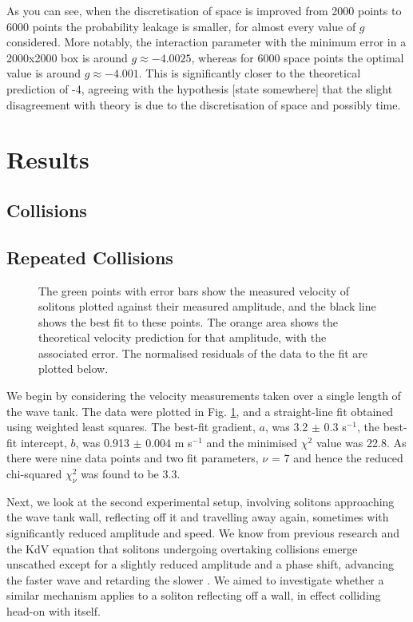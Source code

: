 \documentclass[10pt, twocolumn]{revtex4}    %
\begin{document}
As you can see, when the discretisation of space is improved from 2000 points to 6000 points the probability leakage is smaller, for almost every value of $g$ considered. More notably, the interaction parameter with the minimum error in a 2000x2000 box is around $g \approx -4.0025$, whereas for 6000 space points the optimal value is around $g \approx -4.001$. This is significantly closer to the theoretical prediction of -4, agreeing with the hypothesis [state somewhere] that the slight disagreement with theory is due to the discretisation of space and possibly time. 



\section{Results} \label{Results}

\subsection{Collisions}

\subsection{Repeated Collisions}

\begin{figure}[h]
\caption{The green points with error bars show the measured velocity of solitons plotted against their measured amplitude, and the black line shows the best fit to these points. The orange area shows the theoretical velocity prediction for that amplitude, with the associated error. The normalised residuals of the data to the fit are plotted below.}
\label{Graph1}
\end{figure}

We begin by considering the velocity measurements taken over a single length of the wave tank. The data were plotted in Fig. \ref{Graph1}, and a straight-line fit obtained using weighted least squares. The best-fit gradient, $a$, was 3.2 $\pm$ 0.3 s$^{-1}$, the best-fit intercept, $b$, was 0.913 $\pm$ 0.004 m s$^{-1}$ and the minimised $\chi^2$ value was 22.8. As there were nine data points and two fit parameters, $\nu$ = 7 and hence the reduced chi-squared $\chi_\nu^2$ was found to be 3.3. 


Next, we look at the second experimental setup, involving solitons approaching the wave tank wall, reflecting off it and travelling away again, sometimes with significantly reduced amplitude and speed. We know from previous research and the KdV equation that solitons undergoing overtaking collisions emerge unscathed except for a slightly reduced amplitude and a phase shift, advancing the faster wave and retarding the slower \cite{Segur}. We aimed to investigate whether a similar mechanism applies to a soliton reflecting off a wall, in effect colliding head-on with itself. 
\end{document}
